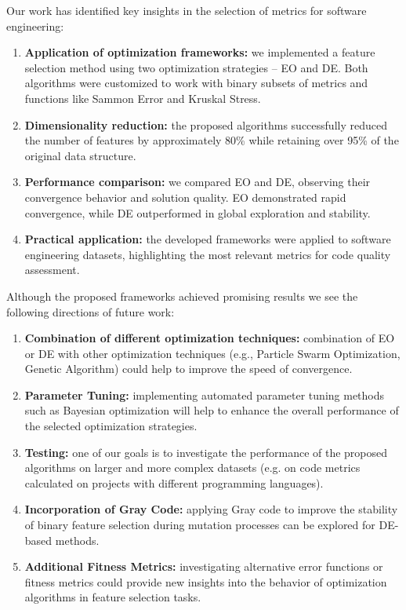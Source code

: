 \documentclass{styles/svproc}
\begin{document}
Our work has identified key insights in the selection of metrics for software engineering:
\begin{enumerate}
    \item \textbf{Application of optimization frameworks:} we implemented a feature selection method using two optimization strategies -- EO and DE. Both algorithms were customized to work with binary subsets of metrics and functions like Sammon Error and Kruskal Stress.
    \item \textbf{Dimensionality reduction:} the proposed algorithms successfully reduced the number of features by approximately 80\% while retaining over 95\% of the original data structure.
    \item \textbf{Performance comparison:} we compared EO and DE, observing their convergence behavior and solution quality. EO demonstrated rapid convergence, while DE outperformed in global exploration and stability.
    \item \textbf{Practical application:}  the developed frameworks were applied to software engineering datasets, highlighting the most relevant metrics for code quality assessment.
\end{enumerate}

Although the proposed frameworks achieved promising results we see the following directions of future work:
\begin{enumerate}
    \item \textbf{Combination of different optimization techniques:} combination of EO or DE with other optimization techniques (e.g., Particle Swarm Optimization, Genetic Algorithm) could help to improve the speed of convergence.
    \item \textbf{Parameter Tuning:} implementing automated parameter tuning methods such as Bayesian optimization will help to enhance the overall performance of the selected optimization strategies.
    \item \textbf{Testing:} one of our goals is to investigate the performance of the proposed algorithms on larger and more complex datasets (e.g. on code metrics calculated on projects with different programming languages).
    \item \textbf{Incorporation of Gray Code:} applying Gray code to improve the stability of binary feature selection during mutation processes can be explored for DE-based methods.
    \item \textbf{Additional Fitness Metrics:} investigating alternative error functions or fitness metrics could provide new insights into the behavior of optimization algorithms in feature selection tasks.
\end{enumerate}
\end{document}
